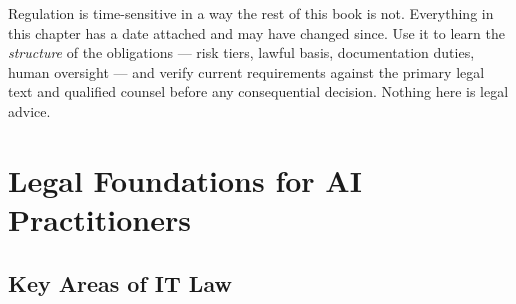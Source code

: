 \begin{engineernote}
Regulation is time-sensitive in a way the rest of this book is not. Everything
in this chapter has a date attached and may have changed since. Use it to learn
the \emph{structure} of the obligations --- risk tiers, lawful basis,
documentation duties, human oversight --- and verify current requirements against
the primary legal text and qualified counsel before any consequential decision.
Nothing here is legal advice.
\end{engineernote}

\section{Legal Foundations for AI Practitioners}

\subsection{Key Areas of IT Law}

